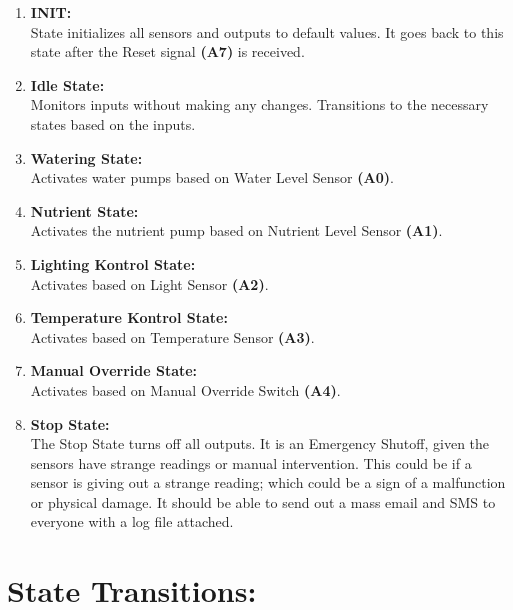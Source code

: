 \documentclass[12pt]{article}
\begin{document}
\begin{enumerate}
  \item\textbf{INIT:}\\
    State initializes all sensors and outputs to default values.
    It goes back to this state after the Reset signal \textbf{(A7)} is received.
  \item\textbf{Idle State:}\\
    Monitors inputs without making any changes. Transitions to the necessary states based on the inputs.
  \item\textbf{Watering State:}\\
    Activates water pumps based on Water Level Sensor \textbf{(A0)}.
  \item\textbf{Nutrient State:}\\
    Activates the nutrient pump based on Nutrient Level Sensor \textbf{(A1)}.
  \item\textbf{Lighting Kontrol State:}\\
    Activates based on Light Sensor \textbf{(A2)}.
  \item\textbf{Temperature Kontrol State:}\\
    Activates based on Temperature Sensor \textbf{(A3)}.
  \item\textbf{Manual Override State:}\\
    Activates based on Manual Override Switch \textbf{(A4)}.
  \item\textbf{Stop State:}\\
  The Stop State turns off all outputs. It is an Emergency Shutoff, given the sensors have strange readings or manual intervention.
  This could be if a sensor is giving out a strange reading; which could be a sign of a malfunction or physical damage.
    It should be able to send out a mass email and SMS to everyone with a log file attached.
\end{enumerate}

\pagebreak
\section{State Transitions:}
\end{document}

